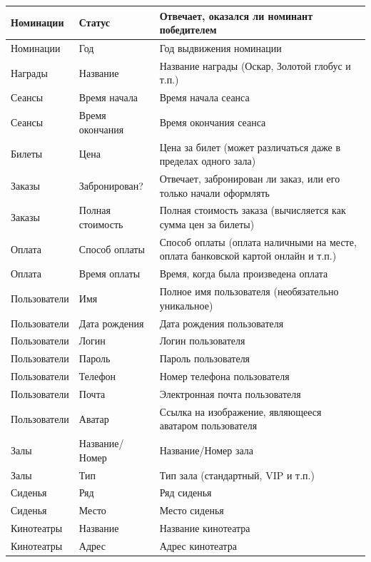 \documentclass[a4paper,12pt]{article}
\renewcommand{\^}[2]{#1^{\, #2} \kern -1pt}
\newcommand{\1}{\kern 1pt}
\newcommand{\0}{\kern -1pt}
\begin{document}
	\begin{center}
		\begin{tabular}{|p{4cm}|p{4cm}|p{7cm}|}
			\hline
			Номинации	& Статус	& Отвечает, оказался ли номинант победителем	\\ \hline
			Номинации	& Год	& Год выдвижения номинации	\\ \hline
			Награды	& Название	& Название награды (Оскар, Золотой глобус и т.п.)	\\ \hline
			Сеансы	& Время начала	& Время начала сеанса	\\ \hline
			Сеансы	& Время окончания	& Время окончания сеанса	\\ \hline
			Билеты	& Цена	& Цена за билет (может различаться даже в пределах одного зала)	\\ \hline
			Заказы	& Забронирован?	& Отвечает, забронирован ли заказ, или его только начали оформлять	\\ \hline
			Заказы	& Полная стоимость	& Полная стоимость заказа (вычисляется как сумма цен за билеты)	\\ \hline
			Оплата	& Способ оплаты	& Способ оплаты (оплата наличными на месте, оплата банковской картой онлайн и т.п.)	\\ \hline
			Оплата	& Время оплаты	& Время, когда была произведена оплата	\\ \hline
			Пользователи	& Имя	& Полное имя пользователя (необязательно уникальное)	\\ \hline
			Пользователи	& Дата рождения	& Дата рождения пользователя	\\ \hline
			Пользователи	& Логин	& Логин пользователя	\\ \hline
			Пользователи	& Пароль	& Пароль пользователя	\\ \hline
			Пользователи	& Телефон	& Номер телефона пользователя	\\ \hline
			Пользователи	& Почта	& Электронная почта пользователя	\\ \hline
			Пользователи	& Аватар	& Ссылка на изображение, являющееся аватаром пользователя	\\ \hline
			Залы	& Название/Номер	& Название/Номер зала	\\ \hline
			Залы	& Тип	& Тип зала (стандартный, VIP и т.п.)	\\ \hline
			Сиденья	& Ряд	& Ряд сиденья	\\ \hline
			Сиденья	& Место	& Место сиденья	\\ \hline
			Кинотеатры	& Название	& Название кинотеатра	\\ \hline
			Кинотеатры	& Адрес	& Адрес кинотеатра	\\ \hline
		\end{tabular}
	\end{center}
\end{document}
